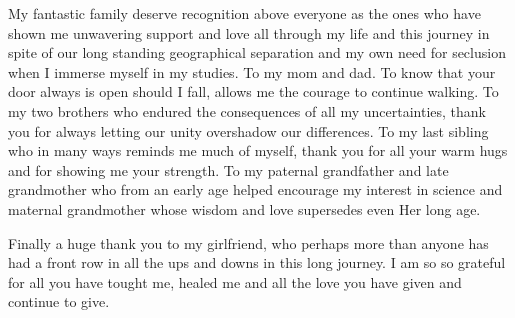 My fantastic family deserve recognition above everyone as the ones who have shown me unwavering support and love all
through my life and this journey in spite of our long standing geographical separation and my own need for seclusion
when I immerse myself in my studies. To my mom and dad. To know that your door always is open should I fall, allows me
the courage to continue walking. To my two brothers who endured the consequences of all my uncertainties, thank you for
always letting our unity overshadow our differences. To my last sibling who in many ways reminds me much of myself,
thank you for all your warm hugs and for showing me your strength. To my paternal grandfather and late grandmother
who from an early age helped encourage my interest in science and maternal grandmother whose wisdom and love supersedes even
Her long age.

Finally a huge thank you to my girlfriend, who perhaps more than anyone has had a front row in all the ups and downs
in this long journey. I am so so grateful for all you have tought me, healed me and all the love you have given and continue to give.
